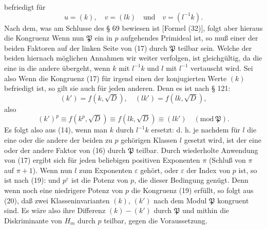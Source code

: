 befriedigt für
\[
u = (k), \quad v = (lk) \quad \text{und} \quad v = (l^{-1}k).
\]
Nach dem, was am Schlusse des § 69 bewiesen ist [Formel
(32)], folgt aber hieraus die Kongruenz
Wenn nun $\mathfrak P$ ein in $p$ aufgehendes Primideal ist, so muß
einer der beiden Faktoren auf der linken Seite von (17) %
durch $\mathfrak P$
teilbar sein. Welche der beiden hiernach möglichen Annahmen
wir weiter verfolgen, ist gleichgültig, da die eine in die andere
übergeht, wenn $k$ mit $l^{-1}k$ und $l$ mit $l^{-1}$ vertauscht wird. Sei
also
Wenn die Kongruenz (17) für irgend einen der konjugierten
Werte $(k)$ befriedigt ist, so gilt sie auch für jeden anderen.
Denn es ist nach § 121:
\[
(k') = f(k, \sqrt{D}), \quad (lk') = f(lk, \sqrt{D}),
\]
also
\[
(k')^p \equiv f(k^p, \sqrt{D}) \equiv f(lk, \sqrt{D}) \equiv (lk') \quad (\mathrm{mod}\ \mathfrak P).
\]
Es folgt also aus (14), %
wenn man $k$ durch $l^{-1}k$ ersetzt:
d. h. je nachdem für $l$ die eine oder die andere der beiden zu $p$
gehörigen Klassen $l$ gesetzt wird, ist der eine oder der andere
Faktor von (16) durch $\mathfrak P$ teilbar.
Durch wiederholte Anwendung von (17) ergibt sich für jeden
beliebigen positiven Exponenten $\pi$
(Schluß von $\pi$ auf $\pi + 1$).
Wenn nun $l$ zum Exponenten $\varepsilon$ gehört, oder $\varepsilon$ der Index von
$p$ ist, so ist nach (19):
und $p^\varepsilon$ ist die  Potenz von $p$, die dieser Bedingung
genügt. Denn wenn noch eine niedrigere Potenz von $p$ die Kongruenz (19) erfüllt, %
so folgt aus (20), daß zwei 
Klasseninvarianten $(k)$, $(k')$ nach dem Modul $\mathfrak P$ kongruent sind.
Es wäre also ihre Differenz $(k) - (k')$ durch $\mathfrak P$ und mithin die
Diskriminante von $H_m$ durch $p$ teilbar, gegen die Voraussetzung.
